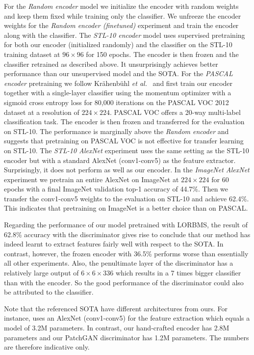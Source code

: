 \documentclass[a4paper,12pt]{report}
\begin{document}
For the \textit{Random encoder} model we initialize the encoder with random weights and keep them fixed while training only the classifier. We unfreeze the encoder weights for the \textit{Random encoder (finetuned)} experiment and train the encoder along with the classifier. The \textit{STL-10 encoder} model uses supervised pretraining for both our encoder (initialized randomly) and the classifier on the STL-10 training dataset at $96 \times 96$ for 150 epochs. The encoder is then frozen and the classifier retrained as described above. It unsurprisingly achieves better performance than our unsupervised model and the SOTA. For the \textit{PASCAL encoder} pretraining we follow Krähenbühl \textit{et al.}~\cite{PascalVocTraining} and first train our encoder together with a single-layer classifier using the momentum optimizer with a sigmoid cross entropy loss for 80,000 iterations on the PASCAL VOC 2012 dataset at a resolution of $224 \times 224$. PASCAL VOC offers a 20-way multi-label classification task. The encoder is then frozen and transferred for the evaluation on STL-10. The performance is marginally above the \textit{Random encoder} and suggests that pretraining on PASCAL VOC is not effective for transfer learning on STL-10. The \textit{STL-10 AlexNet} experiment uses the same setting as the STL-10 encoder but with a standard AlexNet (conv1-conv5) as the feature extractor. Surprisingly, it does not perform as well as our encoder. In the \textit{ImageNet AlexNet} experiment we pretrain an entire AlexNet on ImageNet at $224 \times 224$ for 60 epochs with a final ImageNet validation top-1 accuracy of 44.7\%. Then we transfer the conv1-conv5 weights to the evaluation on STL-10 and achieve 62.4\%. This indicates that pretraining on ImageNet is a better choice than on PASCAL.

Regarding the performance of our model pretrained with LORBMS, the result of 62.8\% accuracy with the discriminator gives rise to conclude that our method has indeed learnt to extract features fairly well with respect to the SOTA. In contrast, however, the frozen encoder with 36.5\% performs worse than essentially all other experiments. Also, the penultimate layer of the discriminator has a relatively large output of $6 \times 6 \times 336$ which results in a 7 times bigger classifier than with the encoder. So the good performance of the discriminator could also be attributed to the classifier.

Note that the referenced SOTA have different architectures from ours. For instance, \cite{SpotArtifacts} uses an AlexNet (conv1-conv5) for the feature extraction which equals a model of 3.2M parameters. In contrast, our hand-crafted encoder has 2.8M parameters and our PatchGAN discriminator has 1.2M parameters. The numbers are therefore indicative only.
\end{document}
